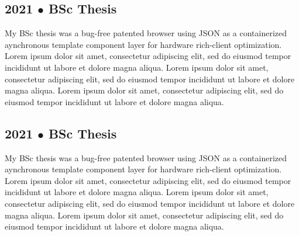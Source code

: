 \subsection{2021 $\bullet$ BSc Thesis}
My BSc thesis was a bug-free patented browser using JSON as a containerized aynchronous template component layer for hardware rich-client optimization.
Lorem ipsum dolor sit amet, consectetur adipiscing elit, sed do eiusmod tempor incididunt ut labore et dolore magna aliqua. 
Lorem ipsum dolor sit amet, consectetur adipiscing elit, sed do eiusmod tempor incididunt ut labore et dolore magna aliqua. 
Lorem ipsum dolor sit amet, consectetur adipiscing elit, sed do eiusmod tempor incididunt ut labore et dolore magna aliqua. 
\subsection{2021 $\bullet$ BSc Thesis}
My BSc thesis was a bug-free patented browser using JSON as a containerized aynchronous template component layer for hardware rich-client optimization.
Lorem ipsum dolor sit amet, consectetur adipiscing elit, sed do eiusmod tempor incididunt ut labore et dolore magna aliqua. 
Lorem ipsum dolor sit amet, consectetur adipiscing elit, sed do eiusmod tempor incididunt ut labore et dolore magna aliqua. 
Lorem ipsum dolor sit amet, consectetur adipiscing elit, sed do eiusmod tempor incididunt ut labore et dolore magna aliqua. 
